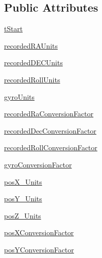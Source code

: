 \subsection*{Public Attributes}
\begin{DoxyCompactItemize}
\item 
\hyperlink{classmodest_1_1spacecraft_1_1chandra_1_1ChandraDynamics_a9452eb26e394075494e1f5c3a621c87c}{t\+Start}
\item 
\hyperlink{classmodest_1_1spacecraft_1_1chandra_1_1ChandraDynamics_a125e53edd0dd24e5a982947bf5053913}{recorded\+R\+A\+Units}
\item 
\hyperlink{classmodest_1_1spacecraft_1_1chandra_1_1ChandraDynamics_af4ded860f3473bcf94a104e5a99c3c15}{recorded\+D\+E\+C\+Units}
\item 
\hyperlink{classmodest_1_1spacecraft_1_1chandra_1_1ChandraDynamics_ad99131d48ee842bbc401a560c199c744}{recorded\+Roll\+Units}
\item 
\hyperlink{classmodest_1_1spacecraft_1_1chandra_1_1ChandraDynamics_a14d24cfa07599c0d0a5011bc961ff7f3}{gyro\+Units}
\item 
\hyperlink{classmodest_1_1spacecraft_1_1chandra_1_1ChandraDynamics_aba11edaafb844edad6e00a63dc81efe5}{recorded\+Ra\+Conversion\+Factor}
\item 
\hyperlink{classmodest_1_1spacecraft_1_1chandra_1_1ChandraDynamics_ab3bd27682f648ccadadc0f2ea4d94a00}{recorded\+Dec\+Conversion\+Factor}
\item 
\hyperlink{classmodest_1_1spacecraft_1_1chandra_1_1ChandraDynamics_a75623219c9f19d354a55523742d7965e}{recorded\+Roll\+Conversion\+Factor}
\item 
\hyperlink{classmodest_1_1spacecraft_1_1chandra_1_1ChandraDynamics_afe69133b89c99c1e82d45abbed9f67ce}{gyro\+Conversion\+Factor}
\item 
\hyperlink{classmodest_1_1spacecraft_1_1chandra_1_1ChandraDynamics_a108e84849b631086fb2de9f97c6efd06}{pos\+X\+\_\+\+Units}
\item 
\hyperlink{classmodest_1_1spacecraft_1_1chandra_1_1ChandraDynamics_adf49521ce1df19bdb1173295619a3294}{pos\+Y\+\_\+\+Units}
\item 
\hyperlink{classmodest_1_1spacecraft_1_1chandra_1_1ChandraDynamics_a7214332454c107c6e9b1c00ecb95ab94}{pos\+Z\+\_\+\+Units}
\item 
\hyperlink{classmodest_1_1spacecraft_1_1chandra_1_1ChandraDynamics_aab9e26d67ebaef20419e0a0d4f1685b1}{pos\+X\+Conversion\+Factor}
\item 
\hyperlink{classmodest_1_1spacecraft_1_1chandra_1_1ChandraDynamics_af86d4bc2f351317e101735d97deb5e14}{pos\+Y\+Conversion\+Factor}

\end{DoxyCompactItemize}
